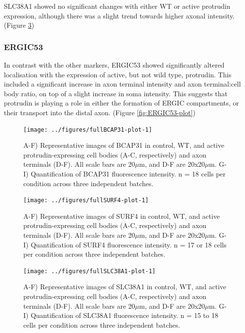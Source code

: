 \documentclass[
  12pt,
  a4paper,
]{book}
\begin{document}
SLC38A1 showed no significant changes with either WT or active protrudin expression, although there was a slight trend towards higher axonal intensity. (Figure \ref{fig:SLC38A1-plot})

\hypertarget{ergic53}{%
\subsubsection{ERGIC53}\label{ergic53}}

In contrast with the other markers, ERGIC53 showed significantly altered localisation with the expression of active, but not wild type, protrudin. This included a significant increase in axon terminal intensity and axon terminal:cell body ratio, on top of a slight increase in soma intensity. This suggests that protrudin is playing a role in either the formation of ERGIC compartments, or their transport into the distal axon. (Figure \ref{fig:ERGIC53-plot})

\begin{figure}
\texttt{[image: ../figures/fullBCAP31-plot-1]} \caption[BCAP31 localisation in protrudin-expressing neurons]{A-F) Representative images of BCAP31 in control, WT, and active protrudin-expressing cell bodies (A-C, respectively) and axon terminals (D-F).  All scale bars are 20$\mu$m, and D-F are 20x20$\mu$m.  G-I) Quantification of BCAP31 fluorescence intensity. n = 18 cells per condition across three independent batches.}\label{fig:BCAP31-plot}
\end{figure}

\begin{figure}
\texttt{[image: ../figures/fullSURF4-plot-1]} \caption[SURF4 localisation in protrudin-expressing neurons]{A-F) Representative images of SURF4 in control, WT, and active protrudin-expressing cell bodies (A-C, respectively) and axon terminals (D-F).  All scale bars are 20$\mu$m, and D-F are 20x20$\mu$m.  G-I) Quantification of SURF4 fluorescence intensity. n = 17 or 18 cells per condition across three independent batches.}\label{fig:SURF4-plot}
\end{figure}

\begin{figure}
\texttt{[image: ../figures/fullSLC38A1-plot-1]} \caption[SLC38A1 localisation in protrudin-expressing neurons]{A-F) Representative images of SLC38A1 in control, WT, and active protrudin-expressing cell bodies (A-C, respectively) and axon terminals (D-F).  All scale bars are 20$\mu$m, and D-F are 20x20$\mu$m.  G-I) Quantification of SLC38A1 fluorescence intensity. n = 15 to 18 cells per condition across three independent batches.}\label{fig:SLC38A1-plot}
\end{figure}
\end{document}

